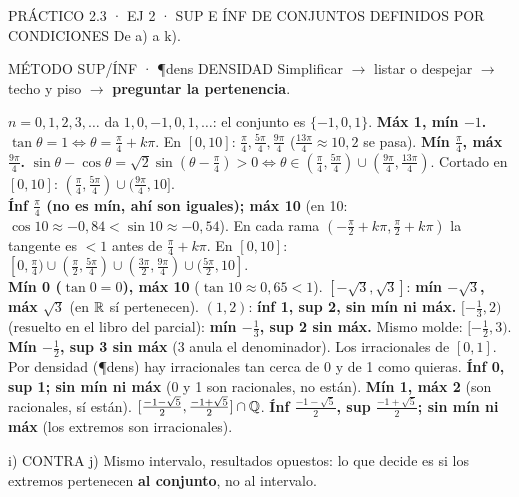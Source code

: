 \begin{enunciado}{PRÁCTICO 2.3 · EJ 2 · SUP E ÍNF DE CONJUNTOS DEFINIDOS POR CONDICIONES}
De a) a k).
\end{enunciado}
\begin{uso}{MÉTODO SUP/ÍNF · \P{dens} DENSIDAD}
Simplificar $\to$ listar o despejar $\to$ techo y piso $\to$ \textbf{preguntar la pertenencia}.
\end{uso}
$n=0,1,2,3,\dots$ da $1,0,-1,0,1,\dots$: el conjunto es $\{-1,0,1\}$. \textbf{Máx 1, mín $-1$.}
$\tan\theta=1\iff\theta=\frac\pi4+k\pi$. En $[0,10]$: $\frac\pi4,\frac{5\pi}4,\frac{9\pi}4$ ($\frac{13\pi}4\approx10{,}2$ se pasa). \textbf{Mín $\frac\pi4$, máx $\frac{9\pi}4$.}
$\sin\theta-\cos\theta=\sqrt2\sin(\theta-\frac\pi4)>0\iff\theta\in(\frac\pi4,\frac{5\pi}4)\cup(\frac{9\pi}4,\frac{13\pi}4)$. Cortado en $[0,10]$: $(\frac\pi4,\frac{5\pi}4)\cup(\frac{9\pi}4,10]$.\\
\textbf{Ínf $\frac\pi4$ (no es mín, ahí son iguales); máx 10} (en 10: $\cos10\approx-0{,}84<\sin10\approx-0{,}54$\ok).
En cada rama $(-\frac\pi2+k\pi,\frac\pi2+k\pi)$ la tangente es $<1$ antes de $\frac\pi4+k\pi$. En $[0,10]$: $[0,\frac\pi4)\cup(\frac\pi2,\frac{5\pi}4)\cup(\frac{3\pi}2,\frac{9\pi}4)\cup(\frac{5\pi}2,10]$.\\
\textbf{Mín 0 ($\tan0=0$), máx 10} ($\tan10\approx0{,}65<1$).
$[-\sqrt3,\sqrt3]$: \textbf{mín $-\sqrt3$, máx $\sqrt3$} (en $\mathbb{R}$ sí pertenecen).
$(1,2)$: \textbf{ínf 1, sup 2, sin mín ni máx.}
$[-\frac13,2)$ (resuelto en el libro del parcial): \textbf{mín $-\frac13$, sup 2 sin máx.}
Mismo molde: $[-\frac12,3)$. \textbf{Mín $-\frac12$, sup 3 sin máx} (3 anula el denominador).
Los irracionales de $[0,1]$. Por densidad (\P{dens}) hay irracionales tan cerca de 0 y de 1 como quieras. \textbf{Ínf 0, sup 1; sin mín ni máx} (0 y 1 son racionales, no están).
\textbf{Mín 1, máx 2} (son racionales, sí están).
$[\frac{-1-\sqrt5}2,\frac{-1+\sqrt5}2]\cap\mathbb{Q}$. \textbf{Ínf $\frac{-1-\sqrt5}2$, sup $\frac{-1+\sqrt5}2$; sin mín ni máx} (los extremos son irracionales).
\begin{memo}{i) CONTRA j)}
Mismo intervalo, resultados opuestos: lo que decide es si los extremos pertenecen \textbf{al conjunto}, no al intervalo.
\end{memo}

